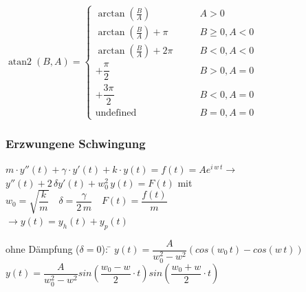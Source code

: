 $\operatorname{atan2}(B, A) = \begin{cases}
\arctan\left(\frac B A\right) & \qquad A > 0 \\
\arctan\left(\frac B A\right) + \pi& \qquad B \ge 0 , A < 0 \\
\arctan\left(\frac B A\right) + 2\pi& \qquad B < 0 , A < 0 \\
+\dfrac{\pi}{2} & \qquad B > 0 , A = 0 \\
+\dfrac{3\pi}{2} & \qquad B < 0 , A = 0 \\
\text{undefined} & \qquad B = 0, A = 0
\end{cases}$

\subsubsection{Erzwungene Schwingung}
$m \cdot y''(t) + \gamma\cdot y'(t) + k \cdot y(t) = f(t)=Ae^{i\,w\,t} \rightarrow$\\
$ y''(t) + 2 \, \delta y'(t) + w_0^2 \, y(t) = F(t)$ mit $w_0=\sqrt{\dfrac{k}{m}} \quad \delta=\dfrac{\gamma}{2\,m} \quad F(t)=\dfrac{f(t)}{m}$\\
$\rightarrow y(t)=y_h(t)+y_p(t)$

\begin{tabbing}
ohne Dämpfung ($\delta = 0$): \= $y(t) = \dfrac{A}{w_0^2-w^2}(cos(w_0\,t)-cos(w\,t))$\\
\> $y(t) = \dfrac{A}{w_0^2-w^2}sin(\dfrac{w_0-w}{2} \cdot t)sin(\dfrac{w_0+w}{2} \cdot t)$\\
\end{tabbing}

